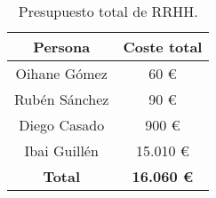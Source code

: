\begin{table}[H]
    \begin{center}
        \begin{tabular}{|c|c|}
            \hline
            \rowcolor{Cyan} 
            \textbf{Persona} & \textbf{Coste total} \\ 
            \hline
            \rowcolor{GrisTabla}
            Oihane Gómez & 60 \euro\\
            \hline
            Rubén Sánchez & 90 \euro\\
            \hline
            \rowcolor{GrisTabla}
            Diego Casado & 900 \euro\\
            \hline
            Ibai Guillén & 15.010 \euro\\
            \hline
            \rowcolor{Naranja}
            \textbf{Total} & \textbf{16.060 \euro}\\
            \hline
        \end{tabular}
        \caption{\centering Presupuesto total de RRHH.}
        \label{tab:PresupuestoRRHH}
    \end{center}    
\end{table}
